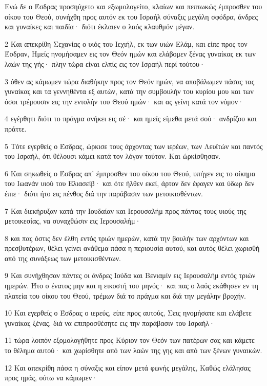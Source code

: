 \par Ενώ δε ο Έσδρας προσηύχετο και εξωμολογείτο, κλαίων και πεπτωκώς έμπροσθεν του οίκου του Θεού, συνήχθη προς αυτόν εκ του Ισραήλ σύναξις μεγάλη σφόδρα, άνδρες και γυναίκες και παιδία· διότι έκλαιεν ο λαός κλαυθμόν μέγαν.
\par 2 Και απεκρίθη Σεχανίας ο υιός του Ιεχιήλ, εκ των υιών Ελάμ, και είπε προς τον Έσδραν, Ημείς ηνομήσαμεν εις τον Θεόν ημών και ελάβομεν ξένας γυναίκας εκ των λαών της γής· πλην τώρα είναι ελπίς εις τον Ισραήλ περί τούτου·
\par 3 όθεν ας κάμωμεν τώρα διαθήκην προς τον Θεόν ημών, να αποβάλωμεν πάσας τας γυναίκας και τα γεννηθέντα εξ αυτών, κατά την συμβουλήν του κυρίου μου και των όσοι τρέμουσιν εις την εντολήν του Θεού ημών· και ας γείνη κατά τον νόμον·
\par 4 εγέρθητι διότι το πράγμα ανήκει εις σέ· και ημείς είμεθα μετά σού· ανδρίζου και πράττε.
\par 5 Τότε εγερθείς ο Έσδρας, ώρκισε τους άρχοντας των ιερέων, των Λευϊτών και παντός του Ισραήλ, ότι θέλουσι κάμει κατά τον λόγον τούτον. Και ώρκίσθησαν.
\par 6 Και σηκωθείς ο Έσδρας απ' έμπροσθεν του οίκου του Θεού, υπήγεν εις το οίκημα του Ιωανάν υιού του Ελιασείβ· και ότε ήλθεν εκεί, άρτον δεν έφαγεν και ύδωρ δεν έπιε· διότι ήτο εις πένθος διά την παράβασιν των μετοικισθέντων.
\par 7 Και διεκήρυξαν κατά την Ιουδαίαν και Ιερουσαλήμ προς πάντας τους υιούς της μετοικεσίας, να συναχθώσιν εις Ιερουσαλήμ·
\par 8 και πας όστις δεν έλθη εντός τριών ημερών, κατά την βουλήν των αρχόντων και πρεσβυτέρων, θέλει γείνει ανάθεμα πάσα η περιουσία αυτού, και αυτός θέλει χωρισθή από της συνάξεως των μετοικισθέντων.
\par 9 Και συνήχθησαν πάντες οι άνδρες Ιούδα και Βενιαμίν εις Ιερουσαλήμ εντός τριών ημερών. Ήτο ο ένατος μην και η εικοστή του μηνός· και πας ο λαός εκάθησεν εν τη πλατεία του οίκου του Θεού, τρέμων διά το πράγμα και διά την μεγάλην βροχήν.
\par 10 Και εγερθείς ο Έσδρας ο ιερεύς, είπε προς αυτούς, Σεις ηνομήσατε και ελάβετε γυναίκας ξένας, διά να επιπροσθέσητε εις την παράβασιν του Ισραήλ·
\par 11 τώρα λοιπόν εξομολογήθητε προς Κύριον τον Θεόν των πατέρων σας και κάμετε το θέλημα αυτού· και χωρίσθητε από των λαών της γης και από των ξένων γυναικών.
\par 12 Και απεκρίθη πάσα η σύναξις και είπον μετά φωνής μεγάλης, Καθώς ελάλησας προς ημάς, ούτω να κάμωμεν·
